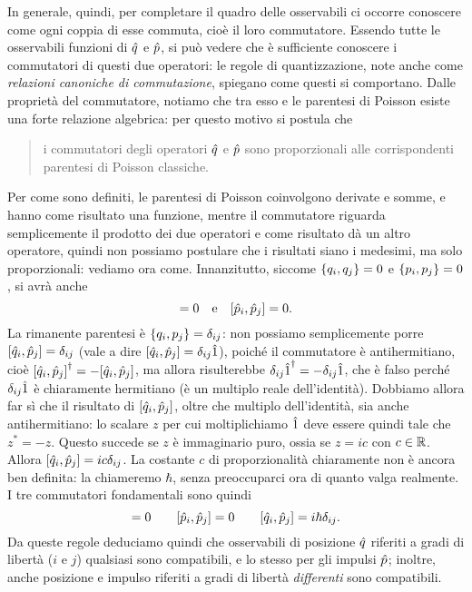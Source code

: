 In generale, quindi, per completare il quadro delle osservabili ci occorre conoscere come ogni coppia di esse commuta, cioè il loro commutatore.
Essendo tutte le osservabili funzioni di $\hat{q}$ e $\hat{p}$, si può vedere che è sufficiente conoscere i commutatori di questi due operatori: le regole di quantizzazione, note anche come \emph{relazioni canoniche di commutazione}, spiegano come questi si comportano.
Dalle proprietà del commutatore, notiamo che tra esso e le parentesi di Poisson esiste una forte relazione algebrica: per questo motivo si postula che
\begin{quote}
	i commutatori degli operatori $\hat{q}$ e $\hat{p}$ sono proporzionali alle corrispondenti parentesi di Poisson classiche.
\end{quote}
Per come sono definiti, le parentesi di Poisson coinvolgono derivate e somme, e hanno come risultato una funzione, mentre il commutatore riguarda semplicemente il prodotto dei due operatori e come risultato dà un altro operatore, quindi non possiamo postulare che i risultati siano i medesimi, ma solo proporzionali: vediamo ora come.
Innanzitutto, siccome $\left\{ {q_i},{q_j}\right\}=0$ e $\left\{ {p_i},{p_j}\right\}=0$, si avrà anche
\begin{equation}
	[\op q_i,\op q_j]=0\quad\text{e}\quad[\op p_i,\op p_j]=0.
\end{equation}
La rimanente parentesi è $\left\{ {q_i},{p_j}\right\}=\delta_{ij}$: non possiamo semplicemente porre $[\hat{q}_i,\hat{p}_j]=\delta_{ij}$ (vale a dire $[\hat{q}_i,\hat{p}_j]=\delta_{ij}\hat{1}$), poich\'e il commutatore è antihermitiano, cioè ${[\hat{q}_i,\hat{p}_j]}^\dagger=-[\hat{q}_i,\hat{p}_j]$, ma allora risulterebbe ${\delta_{ij}\hat{1}}^\dagger=-\delta_{ij}\hat{1}$, che è falso perch\'e $\delta_{ij}\hat{1}$ è chiaramente hermitiano (è un multiplo reale dell'identità).
Dobbiamo allora far s\`i che il risultato di $[\hat{q}_i,\hat{p}_j]$, oltre che multiplo dell'identità, sia anche antihermitiano: lo scalare $z$ per cui moltiplichiamo $\hat{1}$ deve essere quindi tale che $z^*=-z$.
Questo succede se $z$ è immaginario puro, ossia se $z=ic$ con $c\in\mathbb{R}$.
Allora $[\hat{q}_i,\hat{p}_j]=ic\delta_{ij}$.
La costante $c$ di proporzionalità chiaramente non è ancora ben definita: la chiameremo $\hbar$, senza preoccuparci ora di quanto valga realmente.
I tre commutatori fondamentali sono quindi
\begin{equation}
	[\op q_i,\op q_j]=0\qquad[\op p_i,\op p_j]=0\qquad[\op q_i,\op p_j]=i\hbar\delta_{ij}.
	\label{eq:commutatori-fondamentali}
\end{equation}
Da queste regole deduciamo quindi che osservabili di posizione $\hat{q}$ riferiti a gradi di libertà ($i$ e $j$) qualsiasi sono compatibili, e lo stesso per gli impulsi $\hat{p}$; inoltre, anche posizione e impulso riferiti a gradi di libertà \emph{differenti} sono compatibili.
